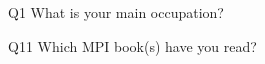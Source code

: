 \begin{description}%
\item{Q1} What is your main occupation?%
\item{Q11} Which MPI book(s) have you read?%
\end{description}%
